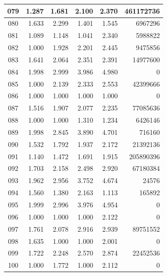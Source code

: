 \begin{longtable}{|c|r|r|r|r|r|}
\hline
079 & 1.287 & 1.681 & 2.100 & 2.370 & 461172736 \\
\hline
080 & 1.633 & 2.299 & 1.401 & 1.545 & 6967296 \\
\hline
081 & 1.089 & 1.148 & 1.041 & 2.340 & 5988822 \\
\hline
082 & 1.000 & 1.928 & 2.201 & 2.445 & 9475856 \\
\hline
083 & 1.641 & 2.064 & 2.351 & 2.391 & 14977600 \\
\hline
084 & 1.998 & 2.999 & 3.986 & 4.980 & 0 \\
\hline
085 & 1.000 & 2.139 & 2.333 & 2.553 & 42399666 \\
\hline
086 & 1.000 & 1.000 & 1.000 & 1.000 & 0 \\
\hline
087 & 1.516 & 1.907 & 2.077 & 2.235 & 77085636 \\
\hline
088 & 1.000 & 1.000 & 1.310 & 1.234 & 6426146 \\
\hline
089 & 1.998 & 2.845 & 3.890 & 4.701 & 716160 \\
\hline
090 & 1.532 & 1.792 & 1.937 & 2.172 & 21392136 \\
\hline
091 & 1.140 & 1.472 & 1.691 & 1.915 & 205890396 \\
\hline
092 & 1.703 & 2.158 & 2.498 & 2.920 & 67180384 \\
\hline
093 & 1.962 & 2.956 & 3.752 & 4.674 & 24576 \\
\hline
094 & 1.560 & 1.380 & 2.163 & 1.113 & 165892 \\
\hline
095 & 1.999 & 2.996 & 3.976 & 4.954 & 0 \\
\hline
096 & 1.000 & 1.000 & 1.000 & 2.122 & 0 \\
\hline
097 & 1.761 & 2.078 & 2.916 & 2.939 & 89751552 \\
\hline
098 & 1.635 & 1.000 & 1.000 & 2.001 & 0 \\
\hline
099 & 1.722 & 2.248 & 2.570 & 2.874 & 22452536 \\
\hline
100 & 1.000 & 1.772 & 1.000 & 2.112 & 0 \\
\hline
\end{longtable}
\normalsize
\renewcommand{\arraystretch}{1.2}
